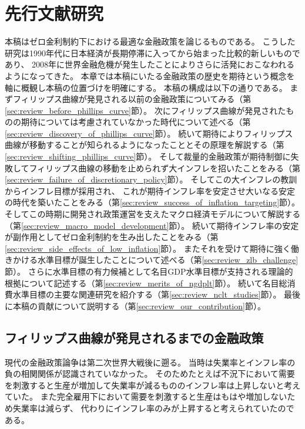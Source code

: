 
\chapter{先行文献研究}
\label{chap:chapter2}
本稿はゼロ金利制約下における最適な金融政策を論じるものである。
こうした研究は1990年代に日本経済が長期停滞に入ってから始まった比較的新しいものであり、
2008年に世界金融危機が発生したことによりさらに活発におこなわれるようになってきた。
本章では本稿にいたる金融政策の歴史を期待という概念を軸に概観し本稿の位置づけを明確にする。
本稿の構成は以下の通りである。
まずフィリップス曲線が発見される以前の金融政策についてみる（第\ref{sec:review_before_phillips_curve}節）。
次にフィリップス曲線が発見されたものの期待については考慮されていなかった時代について述べる（第\ref{sec:review_discovery_of_phillips_curve}節）。
続いて期待によりフィリップス曲線が移動することが知られるようになったこととその原理を解説する（第\ref{sec:review_shifting_phillips_curve}節）。
そして裁量的金融政策が期待制御に失敗してフィリップス曲線の移動を止められず大インフレを招いたことをみる（第\ref{sec:review_failure_of_discretionary_policy}節）。
そしてこの大インフレの教訓からインフレ目標が採用され、
これが期待インフレ率を安定させ大いなる安定の時代を築いたことをみる（第\ref{sec:review_success_of_inflation_targeting}節）。
そしてこの時期に開発され政策運営を支えたマクロ経済モデルについて解説する（第\ref{sec:review_macro_model_development}節）。
続いて期待インフレ率の安定が副作用としてゼロ金利制約を生み出したことをみる（第\ref{sec:review_side_effects_of_low_inflation}節）。
またそれを受けて期待に強く働きかける水準目標が誕生したことについて述べる（第\ref{sec:review_zlb_challenge}節）。
さらに水準目標の有力候補として名目GDP水準目標が支持される理論的根拠について記述する（第\ref{sec:review_merits_of_ngdplt}節）。
続いて名目総消費水準目標の主要な関連研究を紹介する（第\ref{sec:review_nclt_studies}節）。
最後に本稿の貢献について説明する（第\ref{sec:review_our_contribution}節）。

\section{フィリップス曲線が発見されるまでの金融政策}
\label{sec:chapter2_review_before_phillips_curve}
現代の金融政策論争は第二次世界大戦後に遡る\parencite[金融政策の歴史的概観については][などを参照]{ClaridaGaliGertler1999,Woodford2009}。
当時は失業率とインフレ率の負の相関関係が認識されていなかった。
そのためたとえば不況下において需要を刺激すると生産が増加して失業率が減るもののインフレ率は上昇しないと考えていた。
また完全雇用下において需要を刺激すると生産はもはや増加しないため失業率は減らず、
代わりにインフレ率のみが上昇すると考えられていたのである\parencite[この時代の政策思想については][に詳しい]{Friedman1968,GoodfriendKing1997}。

